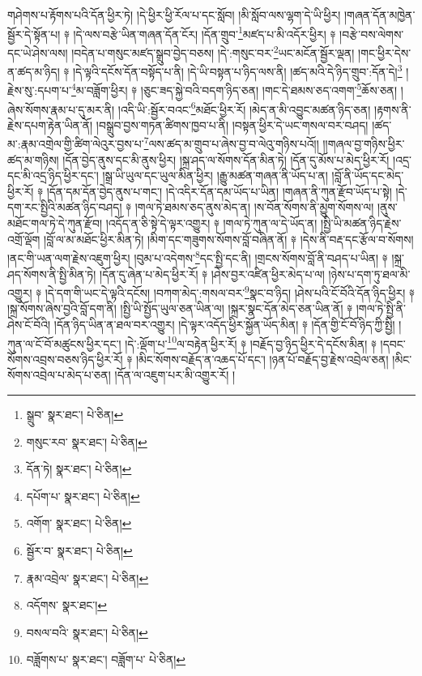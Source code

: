 གཤེགས་པ་རྟོགས་པའི་དོན་ཕྱིར་ཏེ། །དེ་ཕྱིར་ཕྱི་རོལ་པ་དང་སློབ། །མི་སློབ་ལས་ལྷག་དེ་ཡི་ཕྱིར། །གཞན་དོན་མཁྱེན་སྦྱོར་དེ་སྟོན་པ། ༈ །དེ་ལས་བརྩེ་ཡིན་གཞན་དོན་ངོར། །དོན་གྲུབ་\footnote{སྒྲུབ་  སྣར་ཐང་།  པེ་ཅིན། }མཛད་པ་མི་འདོར་ཕྱིར། ༈ །བརྩེ་བས་ལེགས་དང་ཡེ་ཤེས་ལས། །བདེན་པ་གསུང་མཛད་སྒྲུབ་བྱེད་བཅས། །དེ་:གསུང་བར་\footnote{གསུང་རབ་  སྣར་ཐང་།  པེ་ཅིན། }ཡང་མངོན་སྦྱོར་ལྡན། །གང་ཕྱིར་དེས་ན་ཚད་མ་ཉིད། ༈ །དེ་ལྟའི་དངོས་དོན་བསྟོད་པ་ནི། །དེ་ཡི་བསྟན་པ་ཉིད་ལས་ནི། །ཚད་མའི་དེ་ཉིད་གྲུབ་:དོན་དེ།\footnote{དོན་ཏེ།  སྣར་ཐང་།  པེ་ཅིན། } །རྗེས་སུ་:དཔག་པ་\footnote{དཔོག་པ་  སྣར་ཐང་།  པེ་ཅིན། }མ་བཟློག་ཕྱིར། ༈ །ཅུང་ཟད་སྐྱེ་བའི་བདག་ཉིད་ཅན། །གང་དེ་ཐམས་ཅད་འགག་\footnote{འགོག་  སྣར་ཐང་།  པེ་ཅིན། }ཆོས་ཅན། །ཞེས་སོགས་རྣམ་པ་དུ་མར་ནི། །འདི་ཡི་:སྦྱོར་བའང་\footnote{སྦྱོར་བ་  སྣར་ཐང་།  པེ་ཅིན། }མཐོང་ཕྱིར་རོ། །མེད་ན་མི་འབྱུང་མཚན་ཉིད་ཅན། །རྟགས་ནི་རྗེས་དཔག་རྟེན་ཡིན་ནོ། །བསྒྲུབ་བྱས་གཏན་ཚིགས་ཁྱབ་པ་ནི། །བསྟན་ཕྱིར་དེ་ཡང་གསལ་བར་བཤད། །ཚད་མ་:རྣམ་འགྲེལ་གྱི་ཚིག་ལེའུར་བྱས་པ་\footnote{རྣམ་འབྲེལ་  སྣར་ཐང་།  པེ་ཅིན། }ལས་ཚད་མ་གྲུབ་པ་ཞེས་བྱ་བ་ལེའུ་གཉིས་པའོ།། །།གཞལ་བྱ་གཉིས་ཕྱིར་ཚད་མ་གཉིས། །དོན་བྱེད་ནུས་དང་མི་ནུས་ཕྱིར། །སྐྲ་ཤད་ལ་སོགས་དོན་མིན་ཏེ། །དོན་དུ་མོས་པ་མེད་ཕྱིར་རོ། །འདྲ་དང་མི་འདྲ་ཉིད་ཕྱིར་དང་། །སྒྲ་ཡི་ཡུལ་དང་ཡུལ་མིན་ཕྱིར། །རྒྱུ་མཚན་གཞན་ནི་ཡོད་པ་ན། །བློ་ནི་ཡོད་དང་མེད་ཕྱིར་རོ། ༈ །དོན་དམ་དོན་བྱེད་ནུས་པ་གང་། །དེ་འདིར་དོན་དམ་ཡོད་པ་ཡིན། །གཞན་ནི་ཀུན་རྫོབ་ཡོད་པ་སྟེ། །དེ་དག་རང་སྤྱིའི་མཚན་ཉིད་བཤད། ༈ །གལ་ཏེ་ཐམས་ཅད་ནུས་མེད་ན། །ས་བོན་སོགས་ནི་མྱུག་སོགས་ལ། །ནུས་མཐོང་གལ་ཏེ་དེ་ཀུན་རྫོབ། །འདོད་ན་ཅི་སྟེ་དེ་ལྟར་འགྱུར། ༈ །གལ་ཏེ་ཀུན་ལ་དེ་ཡོད་ན། །སྤྱི་ཡི་མཚན་ཉིད་རྗེས་འགྲོ་ལྡོག །བློ་ལ་མ་མཐོང་ཕྱིར་མིན་ཏེ། །མིག་དང་གཟུགས་སོགས་བློ་བཞིན་ནོ། ༈ །དེས་ནི་བརྡ་དང་རྩོལ་བ་སོགས། །ནང་གི་ཡན་ལག་རྗེས་འཇུག་ཕྱིར། །བུམ་པ་འདེགས་\footnote{འདོགས་  སྣར་ཐང་། }དང་སྤྱི་དང་ནི། །གྲངས་སོགས་བློ་ནི་བཤད་པ་ཡིན། ༈ །སྐྲ་ཤད་སོགས་ནི་སྤྱི་མིན་ཏེ། །དོན་དུ་ཞེན་པ་མེད་ཕྱིར་རོ། ༈ །ཤེས་བྱར་འཛིན་ཕྱིར་མེད་པ་ལ། །ཉེས་པ་དག་ཏུ་ཐལ་མི་འགྱུར། ༈ །དེ་དག་གི་ཡང་དེ་ལྟའི་དངོས། །བཀག་མེད་:གསལ་བར་\footnote{བསལ་བའི་  སྣར་ཐང་།  པེ་ཅིན། }སྣང་བ་ཉིད། །ཤེས་པའི་ངོ་བོའི་དོན་ཉིད་ཕྱིར། ༈ །སྐྲ་སོགས་ཞེས་བྱའི་བློ་དག་ནི། །སྤྱི་ཡི་སྤྱོད་ཡུལ་ཅན་ཡིན་ལ། །སྐྲར་སྣང་དོན་མེད་ཅན་ཡིན་ནོ། ༈ །གལ་ཏེ་སྤྱི་ནི་ཤེས་ངོ་བོའི། །དོན་ཉིད་ཡིན་ན་ཐལ་བར་འགྱུར། །དེ་ལྟར་འདོད་ཕྱིར་སྐྱོན་ཡོད་མིན། ༈ །དོན་གྱི་ངོ་བོ་ཉིད་ཀྱི་སྤྱི། །ཀུན་ལ་ངོ་བོ་མཚུངས་ཕྱིར་དང་། །དེ་:ལྡོག་པ་\footnote{བཟློགས་པ་  སྣར་ཐང་། བཟློག་པ་  པེ་ཅིན། }ལ་བརྟེན་ཕྱིར་རོ། ༈ །བརྗོད་བྱ་ཉིད་ཕྱིར་དེ་དངོས་མིན། ༈ །དབང་སོགས་འབྲས་བཅས་ཉིད་ཕྱིར་རོ། ༈ །མིང་སོགས་བརྗོད་ན་འཆད་པོ་དང་། །ཉན་པོ་བརྗོད་བྱ་རྗེས་འབྲེལ་ཅན། །མིང་སོགས་འབྲེལ་པ་མེད་པ་ཅན། །དོན་ལ་འཇུག་པར་མི་འགྱུར་རོ། །
